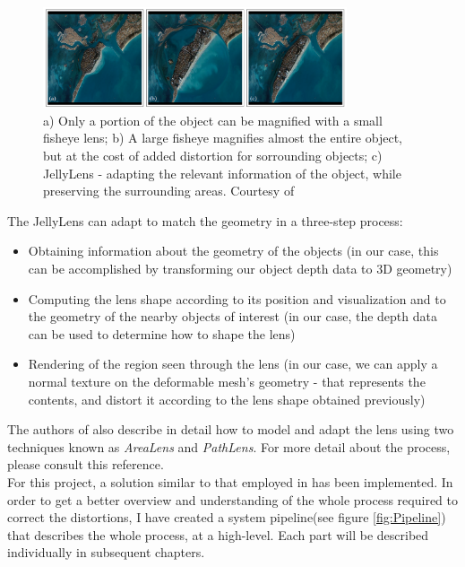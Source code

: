 \documentclass[]{article}
\begin{document}
\begin{figure}[hbtp]
    \centering
    \includegraphics[width=0.8\textwidth]{figures/JellyLens.PNG}
    \caption{a) Only a portion of the object can be magnified with a small fisheye lens; b) A large fisheye magnifies almost the entire object, but at the cost of added distortion for sorrounding objects; c) JellyLens - adapting the relevant information of the object, while preserving the surrounding areas. Courtesy of \cite{pindat12}}
    \label{fig:JellyLens}
\end{figure}

The JellyLens can adapt to match the geometry in a three-step process:
\begin{itemize}
\item Obtaining information about the geometry of the objects (in our case, this can be accomplished by transforming our object depth data to 3D geometry)
\item Computing the lens shape according to its position and visualization and to the geometry of the nearby objects of interest (in our case, the depth data can be used to determine how to shape the lens)
\item Rendering of the region seen through the lens (in our case, we can apply a normal texture on the deformable mesh's geometry - that represents the contents, and distort it according to the lens shape obtained previously)
\end{itemize}

The authors of \cite{pindat12} also describe in detail how to model and adapt the lens using two techniques known as \textit{AreaLens} and \textit{PathLens}. For more detail about the process, please consult this reference.\\

For this project, a solution similar to that employed in \cite{watanabe08} has been implemented. In order to get a better overview and understanding of the whole process required to correct the distortions, I have created a system pipeline(see figure \ref{fig:Pipeline}) that describes the whole process, at a high-level. Each part will be described individually in subsequent chapters.
\end{document}
